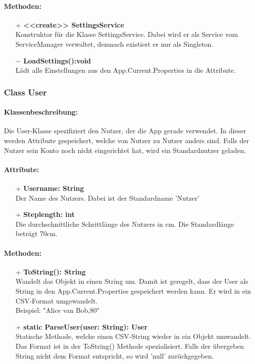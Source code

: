 \documentclass[a4paper,12pt]{article}
\begin{document}
	\paragraph{Methoden:}
	\begin{itemize}
		\item[+] \textbf{<<create>> SettingsService}\\Konstruktor für die Klasse SettingsService. Dabei wird er als Service vom ServiceManager verwaltet, demnach existiert er nur als Singleton.
		\item[$-$] \textbf{LoadSettings():void}\\Lädt alle Einstellungen aus den App.Current.Properties in die Attribute.	
	\end{itemize}
\subsubsection{Class User}
	\paragraph{Klassenbeschreibung:}
	Die User-Klasse spezifiziert den Nutzer, der die App gerade verwendet. In dieser werden Attribute gespeichert, welche von Nutzer zu Nutzer anders sind. Falls der Nutzer sein Konto noch nicht eingerichtet hat, wird ein Standardnutzer geladen.\\
	\paragraph{Attribute:}
	\begin{itemize}
		\item[+] \textbf{Username: String}\\Der Name des Nutzers. Dabei ist der Standardname 'Nutzer'\\
		\item[+] \textbf{Steplength: int}\\Die durchschnittliche Schrittlänge des Nutzers in cm. Die Standardlänge beträgt 70cm.\\
	\end{itemize}
	\paragraph{Methoden:}
	\begin{itemize}
		\item[+] \textbf{ToString(): String}\\Wandelt das Objekt in einen String um. Damit ist geregelt, dass der User als String in den App.Current.Properties gespeichert werden kann. Er wird in ein \Gls{CSV}-Format umgewandelt.\\
		Beispiel: "Alice van Bob,80"\\
		\item[+] \textbf{static ParseUser(user: String): User}\\Statische Methode, welche einen \Gls{CSV}-String wieder in  ein Objekt umwandelt. Das Format ist in der ToString() Methode spezialisiert. Falls der übergeben String nicht dem Format entspricht, so wird 'null' zurückgegeben.\\
	\end{itemize}
\end{document}
